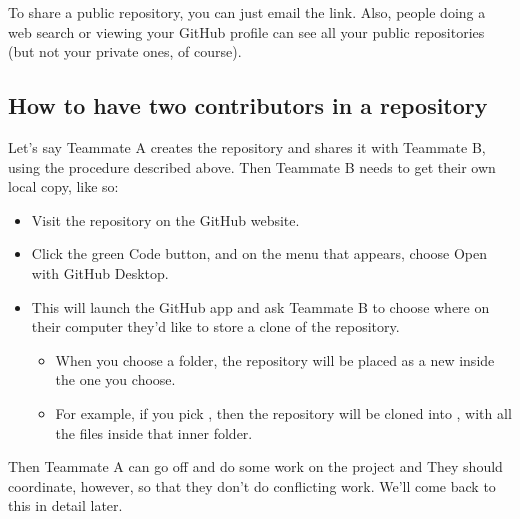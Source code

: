 \documentclass[letterpaper,10pt,english]{jupyterBook}
\begin{document}
\sphinxAtStartPar
To share a public repository, you can just email the link.  Also, people doing a web search or viewing your GitHub profile can see all your public repositories (but not your private ones, of course).


\subsection{How to have two contributors in a repository}
\label{\detokenize{chapter-8-version-control:how-to-have-two-contributors-in-a-repository}}
\sphinxAtStartPar
Let’s say Teammate A creates the repository and shares it with Teammate B, using the procedure described above.  Then Teammate B needs to get their own local copy, like so:
\begin{itemize}
\item {} 
\sphinxAtStartPar
Visit the repository on the GitHub website.

\item {} 
\sphinxAtStartPar
Click the green Code button, and on the menu that appears, choose Open with GitHub Desktop.

\item {} 
\sphinxAtStartPar
This will launch the GitHub app and ask Teammate B to choose where on their computer they’d like to store a clone of the repository.
\begin{itemize}
\item {} 
\sphinxAtStartPar
When you choose a folder, the repository will be placed as a new  inside the one you choose.

\item {} 
\sphinxAtStartPar
For example, if you pick , then the repository will be cloned into , with all the files inside that inner folder.

\end{itemize}

\end{itemize}

\sphinxAtStartPar
Then Teammate A can go off and do some work on the project and   They should coordinate, however, so that they don’t do conflicting work.  We’ll come back to this in detail later.
\end{document}
